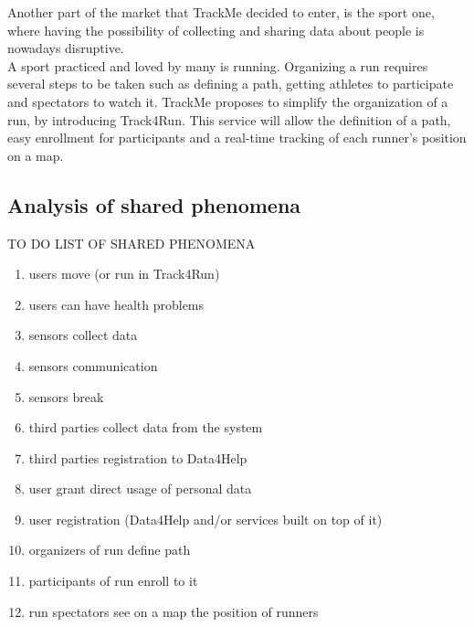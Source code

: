 \documentclass[../../rasd.tex]{subfiles}
\begin{document}
Another part of the market that TrackMe decided to enter, is the sport one, where having the possibility of collecting and sharing data about people is nowadays disruptive.\\
A sport practiced and loved by many is running. Organizing a run requires several steps to be taken such as defining a path, getting athletes to participate and spectators to watch it. TrackMe proposes to simplify the organization of a run, by introducing Track4Run. This service will allow the definition of a path, easy enrollment for participants and a real-time tracking of each runner’s position on a map.
			\subsection{Analysis of shared phenomena}
			TO DO LIST OF SHARED PHENOMENA
			
		\begin{enumerate}
		\item users move (or run in Track4Run)
		\item users can have health problems
		\item sensors collect data
		\item sensors communication
		\item sensors break
		\item third parties collect data from the system
		\item third parties registration to Data4Help
		\item user grant direct usage of personal data
		\item user registration (Data4Help and/or services built on top of it)
		\item organizers of run define path
		\item participants of run enroll to it
		\item run spectators see on a map the position of runners
		
		\end{enumerate}
\end{document}
